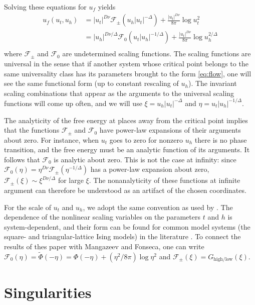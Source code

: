 \documentclass[
aps,
pre,
preprint,
longbibliography,
floatfix
]{revtex4-2}
\begin{document}
Solving these equations for $u_f$ yields
\begin{equation}
  \begin{aligned}
    u_f(u_t, u_h)
    &=|u_t|^{D\nu}\mathcal F_\pm(u_h|u_t|^{-\Delta})+\frac{|u_t|^{D\nu}}{8\pi}\log u_t^2 \\
    &=|u_h|^{D\nu/\Delta}\mathcal F_0(u_t|u_h|^{-1/\Delta})+\frac{|u_t|^{D\nu}}{8\pi}\log u_h^{2/\Delta} \\
  \end{aligned}
\end{equation}
where $\mathcal F_\pm$ and $\mathcal F_0$ are undetermined scaling functions.
The scaling functions are universal in the sense that if another system whose
critical point belongs to the same universality class has its parameters
brought to the form \eqref{eq:flow}, one will see the same functional form (up
to constant rescaling of $u_h$). The invariant scaling combinations that appear
as the arguments to the universal scaling functions will come up often, and we
will use $\xi=u_h|u_t|^{-\Delta}$ and $\eta=u_t|u_h|^{-1/\Delta}$.

The analyticity of the free energy at places away from the critical point implies that the functions
$\mathcal F_\pm$ and $\mathcal F_0$ have power-law expansions of their
arguments about zero. For instance, when $u_t$ goes to zero for nonzero $u_h$
there is no phase transition, and the free energy must be an analytic function
of its arguments. It follows that $\mathcal F_0$ is analytic about zero. This
is not the case at infinity: since $\mathcal F_0(\eta)=\eta^{D\nu}\mathcal
F_\pm(\eta^{-1/\Delta})$ has a power-law expansion about zero, $\mathcal
F_\pm(\xi)\sim \xi^{D\nu/\Delta}$ for large $\xi$. The nonanalyticity of
these functions at infinite argument can therefore be understood as an artifact
of the chosen coordinates.

For the scale of $u_t$ and $u_h$, we adopt the same convention as used by
\cite{Fonseca_2003_Ising}. The dependence of the nonlinear scaling variables on
the parameters $t$ and $h$ is system-dependent, and their form can be found for
common model systems (the square- and triangular-lattice Ising models) in the
literature \cite{Mangazeev_2010_Scaling, Clement_2019_Respect}.  To connect the
results of thes paper with Mangazeev and Fonseca, one can write $\mathcal
F_0(\eta)=\tilde\Phi(-\eta)=\Phi(-\eta)+(\eta^2/8\pi) \log \eta^2$ and
$\mathcal F_\pm(\xi)=G_{\mathrm{high}/\mathrm{low}}(\xi)$.

\section{Singularities}
\end{document}
